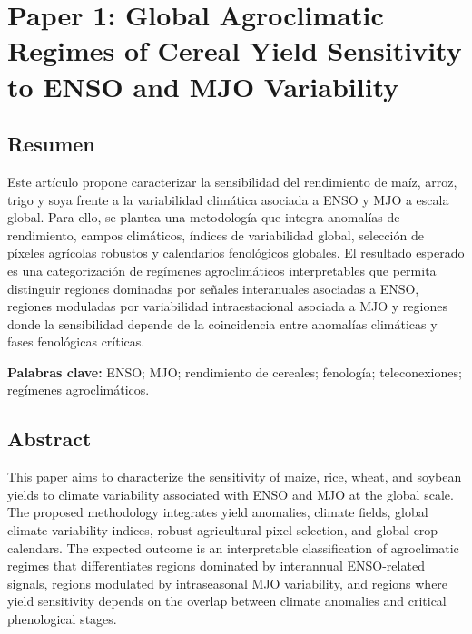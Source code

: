 \chapter{Paper 1: Global Agroclimatic Regimes of Cereal Yield Sensitivity to ENSO and MJO Variability}


\section*{Resumen}

Este artículo propone caracterizar la sensibilidad del rendimiento de maíz, arroz, trigo y soya frente a la variabilidad climática asociada a ENSO y MJO a escala global. Para ello, se plantea una metodología que integra anomalías de rendimiento, campos climáticos, índices de variabilidad global, selección de píxeles agrícolas robustos y calendarios fenológicos globales. El resultado esperado es una categorización de regímenes agroclimáticos interpretables que permita distinguir regiones dominadas por señales interanuales asociadas a ENSO, regiones moduladas por variabilidad intraestacional asociada a MJO y regiones donde la sensibilidad depende de la coincidencia entre anomalías climáticas y fases fenológicas críticas.


\textbf{Palabras clave:} ENSO; MJO; rendimiento de cereales; fenología; teleconexiones; regímenes agroclimáticos.

\section*{Abstract}

This paper aims to characterize the sensitivity of maize, rice, wheat, and soybean yields to climate variability associated with ENSO and MJO at the global scale. The proposed methodology integrates yield anomalies, climate fields, global climate variability indices, robust agricultural pixel selection, and global crop calendars. The expected outcome is an interpretable classification of agroclimatic regimes that differentiates regions dominated by interannual ENSO-related signals, regions modulated by intraseasonal MJO variability, and regions where yield sensitivity depends on the overlap between climate anomalies and critical phenological stages.

